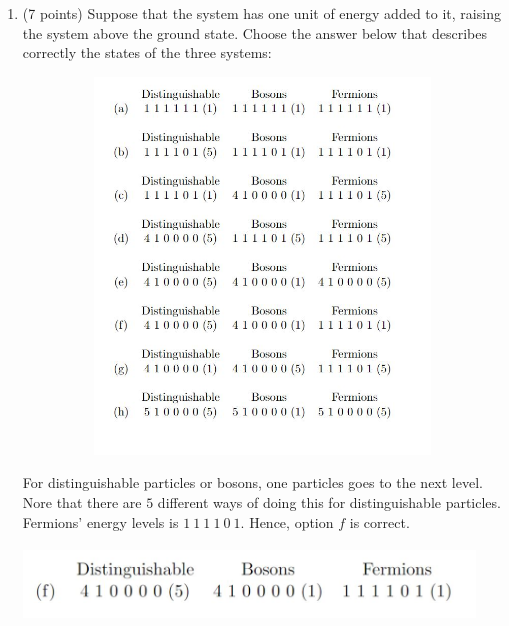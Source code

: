 \documentclass[fleqn]{article}
\begin{document}
\begin{enumerate}
    \pagebreak

    \item (7 points) Suppose that the system has one unit of energy added to it, raising the system above
    the ground state. Choose the answer below that describes correctly the states of the three
    systems:
    \begin{center}
      \includegraphics[height=10cm, width=15cm]{2.JPG}
    \end{center}

      \textcolor{hwColor}{
        For distinguishable particles or bosons, one particles goes to the next level. Nore that there are $5$ different ways of doing this for distinguishable particles.
        Fermions' energy levels is $1 ~ 1 ~ 1 ~ 1 ~ 0 ~ 1$. Hence, option $f$ is correct.
      }
      \begin{center}
        \includegraphics[height=2cm, width=12cm]{Answer2.JPG}
      \end{center}

    \pagebreak


\end{enumerate}
\end{document}
